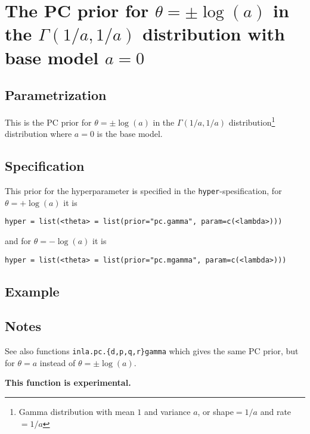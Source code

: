 \documentclass[a4paper,11pt]{article}
\begin{document}
\section*{The PC prior for $\theta = \pm\log(a)$ in the
    $\Gamma(1/a,1/a)$ distribution with base model $a=0$}

\subsection*{Parametrization}

This is the PC prior for $\theta = \pm\log(a)$ in the
$\Gamma(1/a,1/a)$ distribution\footnote{Gamma distribution with mean
    $1$ and variance $a$, or shape$=1/a$ and rate$=1/a$} distribution
where $a=0$ is the base model.

\subsection*{Specification}
This prior for the hyperparameter is specified in the
\texttt{hyper}-spesification, for $\theta = +\log(a)$ it is
\begin{center}
    \texttt{hyper = list(<theta> = list(prior="pc.gamma", param=c(<lambda>)))}
\end{center}
and for $\theta = -\log(a)$ it is
\begin{center}
    \texttt{hyper = list(<theta> = list(prior="pc.mgamma", param=c(<lambda>)))}
\end{center}

\subsection*{Example}

\subsection*{Notes}

See also functions \texttt{inla.pc.\{d,p,q,r\}gamma} which gives the
same PC prior, but for $\theta = a$ instead of $\theta = \pm\log(a)$.

\noindent\textbf{This function is experimental.}
\end{document}
